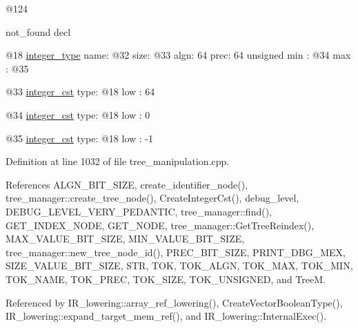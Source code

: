@124

not\+\_\+found decl

@18 \hyperlink{structinteger__type}{integer\+\_\+type} name\+: @32 size\+: @33 algn\+: 64 prec\+: 64 unsigned min \+: @34 max \+: @35

@33 \hyperlink{structinteger__cst}{integer\+\_\+cst} type\+: @18 low \+: 64

@34 \hyperlink{structinteger__cst}{integer\+\_\+cst} type\+: @18 low \+: 0

@35 \hyperlink{structinteger__cst}{integer\+\_\+cst} type\+: @18 low \+: -\/1 

Definition at line 1032 of file tree\+\_\+manipulation.\+cpp.



References A\+L\+G\+N\+\_\+\+B\+I\+T\+\_\+\+S\+I\+ZE, create\+\_\+identifier\+\_\+node(), tree\+\_\+manager\+::create\+\_\+tree\+\_\+node(), Create\+Integer\+Cst(), debug\+\_\+level, D\+E\+B\+U\+G\+\_\+\+L\+E\+V\+E\+L\+\_\+\+V\+E\+R\+Y\+\_\+\+P\+E\+D\+A\+N\+T\+IC, tree\+\_\+manager\+::find(), G\+E\+T\+\_\+\+I\+N\+D\+E\+X\+\_\+\+N\+O\+DE, G\+E\+T\+\_\+\+N\+O\+DE, tree\+\_\+manager\+::\+Get\+Tree\+Reindex(), M\+A\+X\+\_\+\+V\+A\+L\+U\+E\+\_\+\+B\+I\+T\+\_\+\+S\+I\+ZE, M\+I\+N\+\_\+\+V\+A\+L\+U\+E\+\_\+\+B\+I\+T\+\_\+\+S\+I\+ZE, tree\+\_\+manager\+::new\+\_\+tree\+\_\+node\+\_\+id(), P\+R\+E\+C\+\_\+\+B\+I\+T\+\_\+\+S\+I\+ZE, P\+R\+I\+N\+T\+\_\+\+D\+B\+G\+\_\+\+M\+EX, S\+I\+Z\+E\+\_\+\+V\+A\+L\+U\+E\+\_\+\+B\+I\+T\+\_\+\+S\+I\+ZE, S\+TR, T\+OK, T\+O\+K\+\_\+\+A\+L\+GN, T\+O\+K\+\_\+\+M\+AX, T\+O\+K\+\_\+\+M\+IN, T\+O\+K\+\_\+\+N\+A\+ME, T\+O\+K\+\_\+\+P\+R\+EC, T\+O\+K\+\_\+\+S\+I\+ZE, T\+O\+K\+\_\+\+U\+N\+S\+I\+G\+N\+ED, and TreeM.



Referenced by I\+R\+\_\+lowering\+::array\+\_\+ref\+\_\+lowering(), Create\+Vector\+Boolean\+Type(), I\+R\+\_\+lowering\+::expand\+\_\+target\+\_\+mem\+\_\+ref(), and I\+R\+\_\+lowering\+::\+Internal\+Exec().

